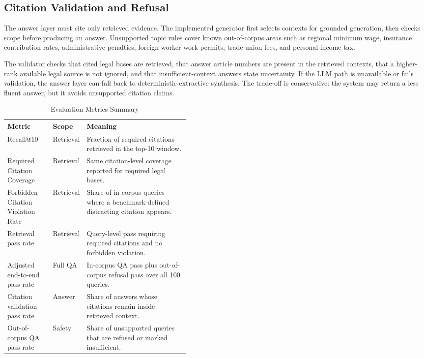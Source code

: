\subsection{Citation Validation and Refusal}
The answer layer must cite only retrieved evidence. The implemented generator first selects contexts for grounded generation, then checks scope before producing an answer. Unsupported topic rules cover known out-of-corpus areas such as regional minimum wage, insurance contribution rates, administrative penalties, foreign-worker work permits, trade-union fees, and personal income tax.

The validator checks that cited legal bases are retrieved, that answer article numbers are present in the retrieved contexts, that a higher-rank available legal source is not ignored, and that insufficient-context answers state uncertainty. If the LLM path is unavailable or fails validation, the answer layer can fall back to deterministic extractive synthesis. The trade-off is conservative: the system may return a less fluent answer, but it avoids unsupported citation claims.

\begin{table}[H]
  \centering
  \caption{Evaluation Metrics Summary}
  \label{tab:metrics-summary-draft}
  \begin{tabularx}{\linewidth}{@{}L{0.25\linewidth}L{0.18\linewidth}Y@{}}
    \toprule
    Metric & Scope & Meaning \\
    \midrule
    Recall@10 & Retrieval & Fraction of required citations retrieved in the top-10 window. \\
    Required Citation Coverage & Retrieval & Same citation-level coverage reported for required legal bases. \\
    Forbidden Citation Violation Rate & Retrieval & Share of in-corpus queries where a benchmark-defined distracting citation appears. \\
    Retrieval pass rate & Retrieval & Query-level pass requiring required citations and no forbidden violation. \\
    Adjusted end-to-end pass rate & Full QA & In-corpus QA pass plus out-of-corpus refusal pass over all 100 queries. \\
    Citation validation pass rate & Answer & Share of answers whose citations remain inside retrieved context. \\
    Out-of-corpus QA pass rate & Safety & Share of unsupported queries that are refused or marked insufficient. \\
    \bottomrule
  \end{tabularx}
\end{table}
